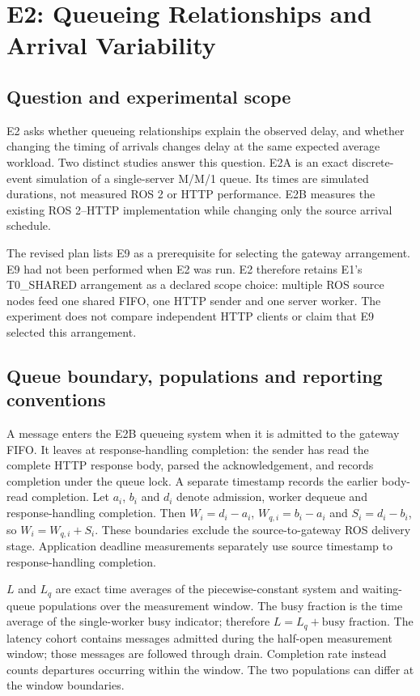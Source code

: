 \section{E2: Queueing Relationships and Arrival Variability}

\subsection{Question and experimental scope}

E2 asks whether queueing relationships explain the observed delay, and whether changing the timing of arrivals changes delay at the same expected average workload. Two distinct studies answer this question. E2A is an exact discrete-event simulation of a single-server M/M/1 queue. Its times are simulated durations, not measured ROS 2 or HTTP performance. E2B measures the existing ROS 2--HTTP implementation while changing only the source arrival schedule.

The revised plan lists E9 as a prerequisite for selecting the gateway arrangement. E9 had not been performed when E2 was run. E2 therefore retains E1's T0\_SHARED arrangement as a declared scope choice: multiple ROS source nodes feed one shared FIFO, one HTTP sender and one server worker. The experiment does not compare independent HTTP clients or claim that E9 selected this arrangement.

\subsection{Queue boundary, populations and reporting conventions}

A message enters the E2B queueing system when it is admitted to the gateway FIFO. It leaves at response-handling completion: the sender has read the complete HTTP response body, parsed the acknowledgement, and records completion under the queue lock. A separate timestamp records the earlier body-read completion. Let $a_i$, $b_i$ and $d_i$ denote admission, worker dequeue and response-handling completion. Then $W_i=d_i-a_i$, $W_{q,i}=b_i-a_i$ and $S_i=d_i-b_i$, so $W_i=W_{q,i}+S_i$. These boundaries exclude the source-to-gateway ROS delivery stage. Application deadline measurements separately use source timestamp to response-handling completion.

$L$ and $L_q$ are exact time averages of the piecewise-constant system and waiting-queue populations over the measurement window. The busy fraction is the time average of the single-worker busy indicator; therefore $L=L_q+\text{busy fraction}$. The latency cohort contains messages admitted during the half-open measurement window; those messages are followed through drain. Completion rate instead counts departures occurring within the window. The two populations can differ at the window boundaries.

